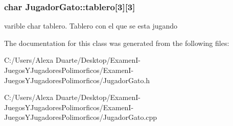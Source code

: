 \subsubsection[{\texorpdfstring{tablero}{tablero}}]{\setlength{\rightskip}{0pt plus 5cm}char Jugador\+Gato\+::tablero\mbox{[}3\mbox{]}\mbox{[}3\mbox{]}\hspace{0.3cm}{\ttfamily [protected]}}\hypertarget{class_jugador_gato_afda277644a559764840c795c936ee22c}{}\label{class_jugador_gato_afda277644a559764840c795c936ee22c}
varible char tablero. Tablero con el que se esta jugando 

The documentation for this class was generated from the following files\+:\begin{DoxyCompactItemize}
\item 
C\+:/\+Users/\+Alexa Duarte/\+Desktop/\+Examen\+I-\/\+Juegos\+Y\+Jugadores\+Polimorficos/\+Examen\+I-\/\+Juegos\+Y\+Jugadores\+Polimorficos/Jugador\+Gato.\+h\item 
C\+:/\+Users/\+Alexa Duarte/\+Desktop/\+Examen\+I-\/\+Juegos\+Y\+Jugadores\+Polimorficos/\+Examen\+I-\/\+Juegos\+Y\+Jugadores\+Polimorficos/Jugador\+Gato.\+cpp\end{DoxyCompactItemize}
